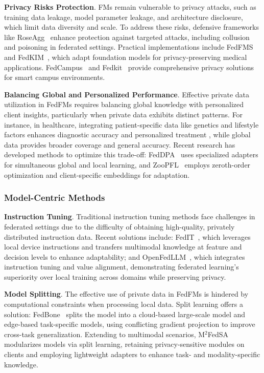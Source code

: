 \textbf{Privacy Risks Protection}.  
FMs remain vulnerable to privacy attacks, such as training data leakage, model parameter leakage, and architecture disclosure, which limit data diversity and scale. To address these risks, defensive frameworks like RoseAgg~\cite{6-data-roseagg} enhance protection against targeted attacks, including collusion and poisoning in federated settings. Practical implementations include FedFMS~\cite{6-data-fedfms} and FedKIM~\cite{6-data-fedkim}, which adapt foundation models for privacy-preserving medical applications.  FedCampus~\cite{6-data-fedcampus} and Fedkit~\cite{Fedkit}  provide comprehensive privacy solutions for smart campus environments.

\textbf{Balancing Global and Personalized Performance}. 
Effective private data utilization in FedFMs requires balancing global knowledge with personalized client insights, particularly when private data exhibits distinct patterns. For instance, in healthcare, integrating patient-specific data like genetics and lifestyle factors enhances diagnostic accuracy and personalized treatment \cite{6-data-health}, while global data provides broader coverage and general accuracy. Recent research has developed methods to optimize this trade-off: FedDPA~\cite{6-data-feddpa} uses specialized adapters for simultaneous global and local learning, and ZooPFL~\cite{lu2023zoopfl} employs zeroth-order optimization and client-specific embeddings for adaptation.

\subsubsection{Model-Centric Methods}


\textbf{Instruction Tuning}.
Traditional instruction tuning methods face challenges in federated settings due to the difficulty of obtaining high-quality, privately distributed instruction data. Recent solutions include: FedIT~\cite{zhang2024fedpit}, which leverages local device instructions and transfers multimodal knowledge at feature and decision levels to enhance adaptability; and OpenFedLLM~\cite{ye2024openfedllm}, which integrates instruction tuning and value alignment, demonstrating federated learning's superiority over local training across domains while preserving privacy.


\textbf{Model Splitting}.
The effective use of private data in FedFMs is hindered by computational constraints when processing local data. Split learning offers a solution: FedBone~\cite{JCST-2308-13639} splits the model into a cloud-based large-scale model and edge-based task-specific models, using conflicting gradient projection to improve cross-task generalization.
Extending to multimodal scenarios, M$^2$FedSA~\cite{zhangenhancing} modularizes models via split learning, retaining privacy-sensitive modules on clients and employing lightweight adapters to enhance task- and modality-specific knowledge.



